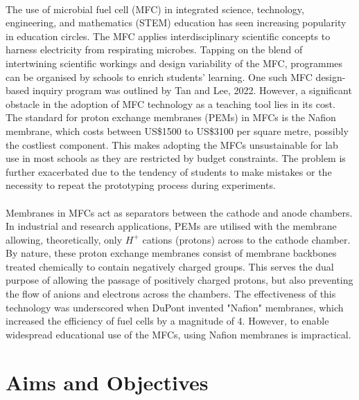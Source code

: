 \documentclass[12pt, twocolumn, a4paper]{article}
\begin{document}
\paragraph{}The use of microbial fuel cell (MFC) in integrated science, technology, engineering, and mathematics (STEM) education has seen increasing popularity in education circles. The MFC applies interdisciplinary scientific concepts to harness electricity from respirating microbes. Tapping on the blend of intertwining scientific workings and design variability of the MFC, programmes can be organised by schools to enrich students' learning. One such MFC design-based inquiry program was outlined by Tan and Lee, 2022. \cite{educsci12060417} However, a significant obstacle in the adoption of MFC technology as a teaching tool lies in its cost. The standard for proton exchange membranes (PEMs) in MFCs is the Nafion\texttrademark{} membrane, which costs between US\$1500 to US\$3100 per square metre, possibly the costliest component. \cite{costnafion} This makes adopting the MFCs unsustainable for lab use in most schools as they are restricted by budget constraints. The problem is further exacerbated due to the tendency of students to make mistakes or the necessity to repeat the prototyping process during experiments. \cite{experimentationandeducation} 

\paragraph{}Membranes in MFCs act as separators between the cathode and anode chambers. In industrial and research applications, PEMs are utilised with the membrane allowing, theoretically, only $H^{+}$ cations (protons) across to the cathode chamber. \cite{Kusoglu2017} By nature, these proton exchange membranes consist of membrane backbones treated chemically to contain negatively charged groups. \cite{cole1972membranes} This serves the dual purpose of allowing the passage of positively charged protons, but also preventing the flow of anions and electrons across the chambers. \cite{Hickner2004} The effectiveness of this technology was underscored when DuPont invented "Nafion" membranes, which increased the efficiency of fuel cells by a magnitude of 4. However, to enable widespread educational use of the MFCs, using Nafion membranes is impractical. 

\section{Aims and Objectives}
\end{document}
